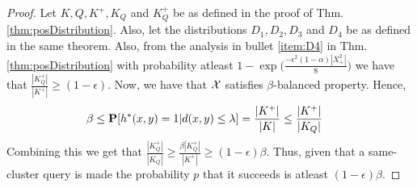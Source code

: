 \posQueries*
\begin{proof}
Let $K, Q, K^+, K_Q$ and $K_Q^+$ be as defined in the proof of Thm. \ref{thm:posDistribution}. Also, let the distributions $D_1, D_2, D_3$ and $D_4$ be as defined in the same theorem. Also, from the analysis in bullet \ref{item:D4} in Thm. \ref{thm:posDistribution} with probability atleast $1 - \exp\Big(\frac{-\epsilon^2(1-\alpha)|X^2_+|}{8}\Big)$ we have that $\frac{|K_Q^+|}{|K^+|} \ge (1-\epsilon)$. Now, we have that $\mathcal X$ satisfies $\beta$-balanced property. Hence,
\begin{align*}
  &\beta \le \mathbf P[h^*(x, y) = 1 | d(x, y) \le \lambda] = \frac{|K^+|}{|K|} \le \frac{|K^+|}{|K_Q|}
\end{align*}
Combining this we get that $\frac{|K_Q^+|}{|K_Q|} \ge \frac{\beta|K_Q^+|}{|K^+|} \ge (1-\epsilon)\beta$. Thus, given that a same-cluster query is made the probability $p$ that it succeeds is atleast $(1-\epsilon)\beta$. 
\end{proof}

